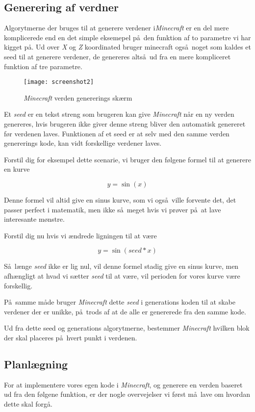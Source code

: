 \documentclass[a4paper,12pt]{report}
\begin{document}
	\subsection{Generering af verdner}
		Algorytmerne der bruges til at generere verdener i\emph{Minecraft} er en del mere komplicerede end en det simple eksemepel p\aa \ den funktion
		af to parametre vi har kigget p\aa . Ud over \emph{X} og \emph{Z} koordinated bruger minecraft ogs\aa \ noget som kaldes et seed til at generere
		verdener, de genereres alts\aa \ ud fra en mere kompliceret funktion af tre parametre.
		
		\begin{wrapfigure}{r}{0.5\textwidth}
			\texttt{[image: screenshot2]}
			\caption{\emph{Minecraft} verden genererings sk\ae rm}
		\end{wrapfigure}

		Et \emph{seed} er en tekst streng som brugeren kan give \emph{Minecraft} n\aa r en ny verden genereres, hvis brugeren ikke giver denne streng
		bliver den automatisk genereret f\o r verdenen laves. Funktionen af et seed er at selv med den samme verden genererings kode,
		kan vidt forskellige verdener laves.

		Forstil dig for eksempel dette scenarie, vi bruger den f\o lgene formel til at generere en kurve

		\[y = \sin (x)\]

		Denne formel vil altid give en sinus kurve, som vi ogs\aa \ ville forvente det, det passer perfect i matematik, men ikke s\aa \ meget
		hvis vi pr\o ver p\aa \ at lave interesante m\o nstre.

		Forstil dig nu hvis vi \ae ndrede ligningen til at være

		\[y = \sin (seed * x)\]

		S\aa \ l\ae nge \emph{seed} ikke er lig nul, vil denne formel stadig give en sinus kurve, men afh\ae ngligt at hvad vi s\ae tter \emph{seed}
		til at v\ae re, vil perioden for vores kurve v\ae re forskellig.

		P\aa \ samme m\aa de bruger \emph{Minecraft} dette \emph{seed} i generations koden til at skabe verdener der er unikke, p\aa \ trods
		af at de alle er genererede fra den samme kode.

		Ud fra dette seed og generations algorytmerne, bestemmer \emph{Minecraft} hvilken blok der skal placeres p\aa \ hvert punkt
		i verdenen.
	\subsection{Planlægning}
		For at implementere vores egen kode i \emph{Minecraft}, og generere en verden baseret ud fra den f\o lgene funktion, er der
		nogle overvejelser vi f\o rst m\aa \ lave om hvordan dette skal forg\aa .
\end{document}
